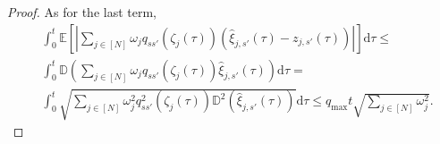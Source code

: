 \documentclass[10pt,a4paper]{amsart}
\newcommand{\E}{\mathbb{E}}
\renewcommand{\d}{\mathrm{d}}
\begin{document}
\begin{proof}
		As for the last term,
		\begin{align*}
			&\int_{0}^{t}\E \left[ \left| \sum_{j \in [N]} \omega_j q_{ss'}(\zeta_j(\tau)) \left(\hat{\xi}_{j,s'}(\tau)-z_{j,s'}(\tau) \right) \right| \right] \d \tau \leq \\
			&\int_{0}^{t} \mathbb{D} \left(\sum_{j \in [N]} \omega_j q_{ss'}(\zeta_j(\tau)) \hat{\xi}_{j,s'}(\tau)  \right)\d \tau =\\
			& \int_{0}^{t} \sqrt{\sum_{j \in [N]} \omega_{j}^2 q_{ss'}^2(\zeta_j(\tau)) \mathbb{D}^2 \left( \hat{\xi}_{j,s'}(\tau)\right)} \d \tau \leq q_{\textrm{max}}t \sqrt{\sum_{j \in [N]} \omega_j^2}.
		\end{align*}
	\end{proof}
\end{document}

